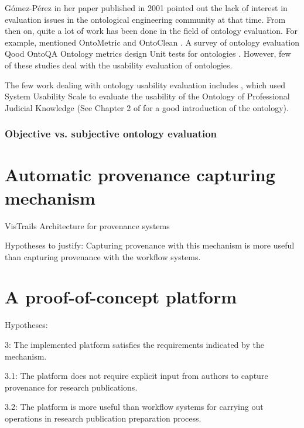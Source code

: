 G{\'o}mez-P{\'e}rez in her paper \cite{gomez2001evaluation} published in 2001 pointed out the lack of interest in evaluation issues in the ontological engineering community at that time. From then on, quite a lot of work has been done in the field of ontology evaluation.  For example, \cite{hartmann2005d1} mentioned OntoMetric \cite{lozano2003selection} and OntoClean \cite{guarino2002evaluating} . A survey of ontology evaluation \cite{brank2005survey} Qood \cite{gangemi2006qood} OntoQA \cite{tartir2005ontoqa} Ontology metrics design \cite{vrandevcic2007design} Unit tests for ontologies \cite{vrandevcic2006unit}. However, few of these studies deal with the usability evaluation of ontologies. 

The few work dealing with ontology usability evaluation includes \cite{casellas2009ontology}, which used System Usability Scale \cite{brooke1996sus} to evaluate the usability of the Ontology of Professional Judicial Knowledge (See Chapter 2 of \cite{casellas2009ontology} for a good introduction of the ontology). 


\subsubsection{Objective vs. subjective ontology evaluation}

\section{Automatic provenance capturing mechanism} 
VisTrails \cite{freire2014reproducibility}
Architecture for provenance systems \cite{groth2006architecture}

Hypotheses to justify: Capturing provenance with this mechanism is more useful than capturing provenance with the workflow systems.


\section{A proof-of-concept platform}
Hypotheses:

3: The implemented platform satisfies the requirements indicated by the mechanism.

3.1: The platform does not require explicit input from authors to capture provenance for research publications.

3.2: The platform is more useful than workflow systems for carrying out operations in research publication preparation process.

